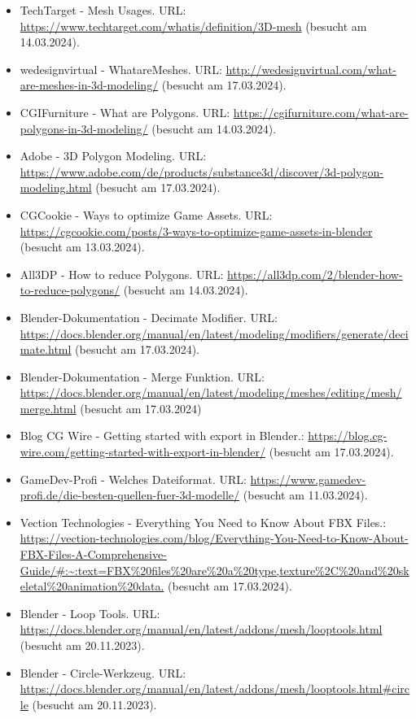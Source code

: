 \begin{itemize}
    \item TechTarget - Mesh Usages. URL: \url{https://www.techtarget.com/whatis/definition/3D-mesh} (besucht am 14.03.2024).
    \item wedesignvirtual - WhatareMeshes. URL: \url{http://wedesignvirtual.com/what-are-meshes-in-3d-modeling/} (besucht am 17.03.2024).
    \item CGIFurniture - What are Polygons. URL: \url{https://cgifurniture.com/what-are-polygons-in-3d-modeling/} (besucht am 14.03.2024).
    \item Adobe - 3D Polygon Modeling. URL: \url{https://www.adobe.com/de/products/substance3d/discover/3d-polygon-modeling.html} (besucht am 17.03.2024).
    \item CGCookie - Ways to optimize Game Assets. URL: \url{https://cgcookie.com/posts/3-ways-to-optimize-game-assets-in-blender} (besucht am 13.03.2024).
    \item All3DP - How to reduce Polygons. URL: \url{https://all3dp.com/2/blender-how-to-reduce-polygons/} (besucht am 14.03.2024).
    \item Blender-Dokumentation - Decimate Modifier. URL: \url{https://docs.blender.org/manual/en/latest/modeling/modifiers/generate/decimate.html} (besucht am 17.03.2024).
    \item Blender-Dokumentation - Merge Funktion. URL: \url{https://docs.blender.org/manual/en/latest/modeling/meshes/editing/mesh/merge.html} (besucht am 17.03.2024)
    \item Blog CG Wire - Getting started with export in Blender.: \url{https://blog.cg-wire.com/getting-started-with-export-in-blender/} (besucht am 17.03.2024).
    \item GameDev-Profi - Welches Dateiformat. URL: \url{https://www.gamedev-profi.de/die-besten-quellen-fuer-3d-modelle/} (besucht am 11.03.2024).
    \item Vection Technologies - Everything You Need to Know About FBX Files.: \url{https://vection-technologies.com/blog/Everything-You-Need-to-Know-About-FBX-Files-A-Comprehensive-Guide/#:~:text=FBX%20files%20are%20a%20type,texture%2C%20and%20skeletal%20animation%20data.} (besucht am 17.03.2024).
    \item Blender - Loop Tools. URL: \url{https://docs.blender.org/manual/en/latest/addons/mesh/looptools.html} (besucht am 20.11.2023).
    \item Blender - Circle-Werkzeug. URL: \url{https://docs.blender.org/manual/en/latest/addons/mesh/looptools.html#circle} (besucht am 20.11.2023).

\end{itemize}
